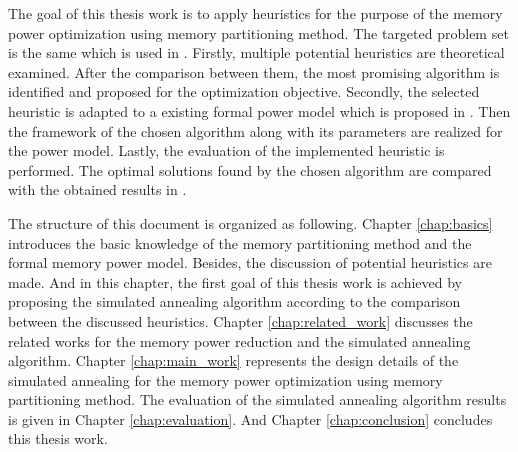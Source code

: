 	The goal of this thesis work is to apply heuristics for the purpose of the memory power optimization using memory partitioning method.
	The targeted problem set is the same which is used in \cite{Strobel2016}.
	Firstly, multiple potential heuristics are theoretical examined. After the comparison between them, the most promising algorithm is identified and proposed for the optimization objective.
	Secondly, the selected heuristic is adapted to a existing formal power model which is proposed in \cite{Strobel2016}.
	Then the framework of the chosen algorithm along with its parameters are realized for the power model.
	Lastly, the evaluation of the implemented heuristic is performed. The optimal solutions found by the chosen algorithm are compared with the
	obtained results in \cite{Strobel2016}.
	
	The structure of this document is organized as following.
	Chapter \ref{chap:basics} introduces the basic knowledge of the memory partitioning method and the formal memory power model.
	Besides, the discussion of potential heuristics are made. And in this chapter, the first goal of this thesis work is achieved by proposing
	the simulated annealing algorithm according to the comparison between the discussed heuristics.
	Chapter \ref{chap:related_work} discusses the related works for the memory power reduction and the simulated annealing algorithm.
	Chapter \ref{chap:main_work} represents the design details of the simulated annealing for the memory power optimization using memory partitioning method.
	The evaluation of the simulated annealing algorithm results is given in Chapter \ref{chap:evaluation}.
	And Chapter \ref{chap:conclusion} concludes this thesis work.


